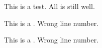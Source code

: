 \documentclass{article}
\begin{document}
	
	\beginnumbering
		\pstart
			\lipsum[1]
		\pend
		\pstart
			This is a test. All is still well.
		\pend
	\endnumbering
	
	\vfill
	
	\begin{minipage}{\textwidth}
		\beginnumbering
			\pstart
				This is a . Wrong line number.
			\pend
		\endnumbering
	\end{minipage}

	\vfill
	
	\begin{minipage}{\textwidth}
		\beginnumbering
			\pstart
				This is a . Wrong line number.
			\pend
		\endnumbering
	\end{minipage}

	\vfill
\end{document}
